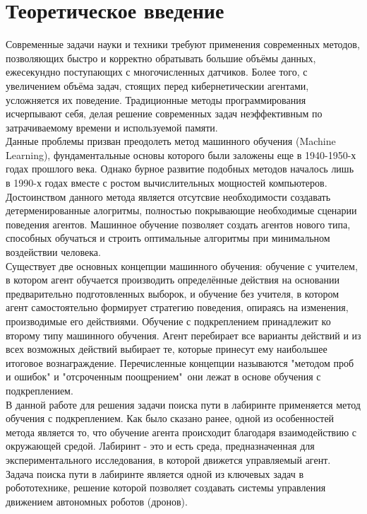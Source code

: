 \documentclass[12pt, a4paper]{report}
\theoremstyle{definition}
\theoremstyle{plain}
\theoremstyle{remark}
\theoremstyle{remark}
\theoremstyle{definition}
\begin{document}
\newpage
\tableofcontents

\newpage
\section{Теоретическое введение}
\label{sec:W1}
Современные задачи науки и техники требуют применения современных методов, позволяющих быстро и корректно обратывать большие объёмы данных, ежесекундно поступающих с многочисленных датчиков. Более того, с увеличением объёма задач, стоящих перед кибернетическии агентами, усложняется их поведение. Традиционные методы программирования исчерпывают себя, делая решение современных задач неэффективным по затрачиваемому времени и используемой памяти.\\

Данные проблемы призван преодолеть метод машинного обучения (Machine Learning), фундаментальные основы которого были заложены еще в 1940-1950-х годах прошлого века. Однако бурное развитие подобных методов началось лишь в 1990-х годах вместе с ростом вычислительных мощностей компьютеров.
Достоинством данного метода является отсутсвие необходимости создавать детерменированные алогритмы, полностью покрывающие необходимые сценарии поведения агентов. Машинное обучение позволяет создать агентов нового типа, способных обучаться и строить оптимальные алгоритмы при минимальном воздействии человека.\\

Существует две основных концепции машинного обучения: обучение с учителем, в котором агент обучается производить определённые действия на основании предварительно подготовленных выборок, и обучение без учителя, в котором агент самостоятельно формирует стратегию поведения, опираясь на изменения, производимые его действиями. Обучение с подкреплением принадлежит ко второму типу машинного обучения. Агент перебирает все варианты действий и из всех возможных действий выбирает те, которые принесут ему наибольшее итоговое вознаграждение. Перечисленные концепции называются "методом проб и ошибок" и "отсроченным поощрением"\, они лежат в основе обучения с подкреплением.\\

В данной работе для решения задачи поиска пути в лабиринте применяется метод обучения с подкреплением. Как было сказано ранее, одной из особенностей метода является то, что обучение агента происходит благодаря взаимодействию с окружающей средой. Лабиринт - это и есть среда, предназначенная для экспериментального исследования, в которой движется управляемый агент. Задача поиска пути в лабиринте является одной из ключевых задач в робототехнике, решение которой позволяет создавать системы управления движением автономных роботов (дронов). \\
\end{document}
